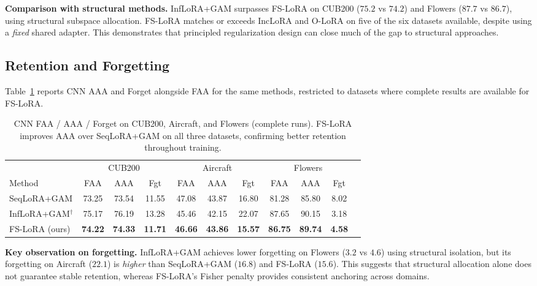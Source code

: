 \textbf{Comparison with structural methods.}
InfLoRA+GAM surpasses FS-LoRA on CUB200 ($75.2$ vs $74.2$) and Flowers ($87.7$ vs $86.7$),
using structural subspace allocation.
FS-LoRA matches or exceeds IncLoRA and O-LoRA on five of the six datasets available,
despite using a \emph{fixed} shared adapter.
This demonstrates that principled regularization design can close much of the gap
to structural approaches.

\subsection{Retention and Forgetting}
\label{sec:retention}

Table~\ref{tab:forget} reports CNN AAA and Forget alongside FAA for the same methods,
restricted to datasets where complete results are available for FS-LoRA.

\begin{table}[h]
\caption{CNN FAA / AAA / Forget on CUB200, Aircraft, and Flowers (complete runs).
FS-LoRA improves AAA over SeqLoRA+GAM on all three datasets,
confirming better retention throughout training.}
\label{tab:forget}
\centering
\small
\begin{tabular}{lcccccccccc}
\toprule
& \multicolumn{3}{c}{CUB200} & \multicolumn{3}{c}{Aircraft} & \multicolumn{3}{c}{Flowers} \\
\cmidrule(lr){2-4}\cmidrule(lr){5-7}\cmidrule(lr){8-10}
Method & FAA & AAA & Fgt & FAA & AAA & Fgt & FAA & AAA & Fgt \\
\midrule
SeqLoRA+GAM & 73.25 & 73.54 & 11.55 & 47.08 & 43.87 & 16.80 & 81.28 & 85.80 & 8.02 \\
InfLoRA+GAM$^\dagger$ & 75.17 & 76.19 & 13.28 & 45.46 & 42.15 & 22.07 & 87.65 & 90.15 & 3.18 \\
FS-LoRA (ours) & \textbf{74.22} & \textbf{74.33} & \textbf{11.71} & \textbf{46.66} & \textbf{43.86} & \textbf{15.57} & \textbf{86.75} & \textbf{89.74} & \textbf{4.58} \\
\bottomrule
\end{tabular}
\end{table}

\textbf{Key observation on forgetting.}
InfLoRA+GAM achieves lower forgetting on Flowers ($3.2$ vs $4.6$) using structural isolation,
but its forgetting on Aircraft ($22.1$) is \emph{higher} than SeqLoRA+GAM ($16.8$) and FS-LoRA ($15.6$).
This suggests that structural allocation alone does not guarantee stable retention,
whereas FS-LoRA's Fisher penalty provides consistent anchoring across domains.

